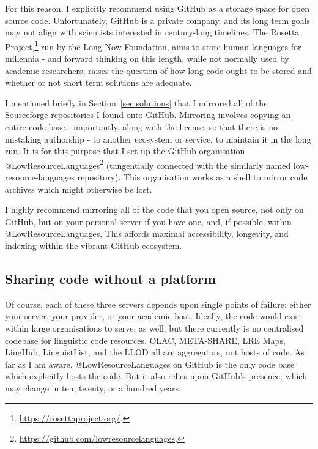 For this reason, I explicitly recommend using GitHub as a storage space for open source code. Unfortunately, GitHub is a private company, and its long term goals may not align with scientists interested in century-long timelines. The Rosetta Project,\footnote{\href{https://rosettaproject.org/}{https://rosettaproject.org/}. } run by the Long Now Foundation, aims to store human languages for millennia - and forward thinking on this length, while not normally used by academic researchers, raises the question of how long code ought to be stored and whether or not short term solutions are adequate.

I mentioned briefly in Section~\ref{sec:solutions} that I mirrored all of the Sourceforge repositories I found onto GitHub. Mirroring involves copying an entire code base - importantly, along with the license, so that there is no mistaking authorship - to another ecosystem or service, to maintain it in the long run. It is for this purpose that I set up the GitHub organisation @LowResourceLanguages\footnote{\href{https://github.com/lowresourcelanguages}{https://github.com/lowresourcelanguages}. } (tangentially connected with the similarly named low-resource-languages repository). This organisation works as a shell to mirror code archives which might otherwise be lost.

I highly recommend mirroring all of the code that you open source, not only on GitHub, but on your personal server if you have one, and, if possible, within @LowResourceLanguages. This affords maximal accessibility, longevity, and indexing within the vibrant GitHub ecosystem.

\subsection{Sharing code without a platform}
\label{subsec:sharing-code-without-a-platform}

Of course, each of these three servers depends upon single points of failure: either your server, your provider, or your academic host. Ideally, the code would exist within large organisations to serve, as well, but there currently is no centralised codebase for linguistic code resources. OLAC, META-SHARE, LRE Maps, LingHub, LinguistList, and the LLOD all are aggregators, not hosts of code. As far as I am aware, @LowResourceLanguages on GitHub is the only code base which explicitly hosts the code. But it also relies upon GitHub's presence; which may change in ten, twenty, or a hundred years.

